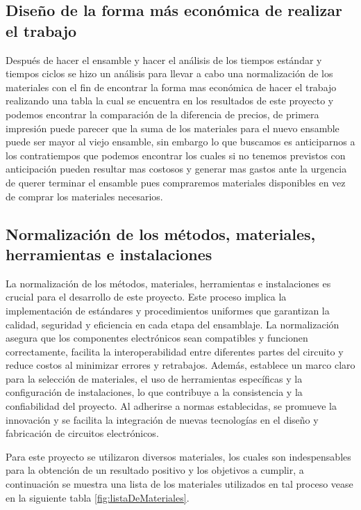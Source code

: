     \subsection{Diseño de la forma más económica de realizar el trabajo}
    Después de hacer el ensamble y hacer el análisis de los tiempos estándar y tiempos ciclos se hizo un análisis para llevar a cabo una normalización de los materiales con el fin de encontrar la forma mas económica de hacer el trabajo realizando una tabla la cual se encuentra en los resultados de este proyecto y podemos encontrar la comparación de la diferencia de precios, de primera impresión puede parecer que la suma de los materiales para el nuevo ensamble puede ser mayor al viejo ensamble, sin embargo lo que buscamos es anticiparnos a los contratiempos que podemos encontrar los cuales si no tenemos previstos con anticipación pueden resultar mas costosos y generar mas gastos ante la urgencia de querer terminar el ensamble pues compraremos materiales disponibles en vez de comprar los materiales necesarios.
    
    \subsection{Normalización de los métodos, materiales, herramientas e instalaciones}
    La normalización de los métodos, materiales, herramientas e instalaciones es crucial para el desarrollo de este proyecto. Este proceso implica la implementación de estándares y procedimientos uniformes que garantizan la calidad, seguridad y eficiencia en cada etapa del ensamblaje. La normalización asegura que los componentes electrónicos sean compatibles y funcionen correctamente, facilita la interoperabilidad entre diferentes partes del circuito y reduce costos al minimizar errores y retrabajos. Además, establece un marco claro para la selección de materiales, el uso de herramientas específicas y la configuración de instalaciones, lo que contribuye a la consistencia y la confiabilidad del proyecto. Al adherirse a normas establecidas, se promueve la innovación y se facilita la integración de nuevas tecnologías en el diseño y fabricación de circuitos electrónicos\cite{normalización}.
    
    
    
    Para este proyecto se utilizaron diversos materiales, los cuales son indespensables para la obtención de un resultado positivo y los objetivos a cumplir, a continuación se muestra una lista de los materiales utilizados en tal proceso vease en la siguiente tabla \ref{fig:listaDeMateriales}.
    
